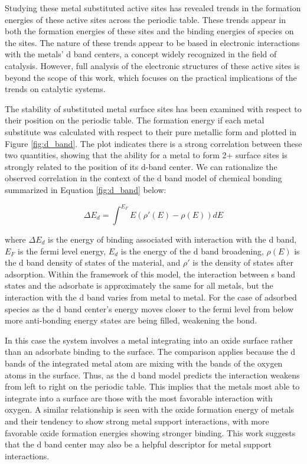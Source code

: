 \documentclass[catalysts,article,submit,moreauthors,pdftex,10pt,a4paper]{mdpi}
\theoremstyle{mdpi}
\newcounter{ex}
\newcounter{re}
\theoremstyle{mdpidefinition}
\begin{document}
Studying these metal substituted active sites has revealed trends in the formation energies of these active sites across the periodic table. These trends appear in both the formation energies of these sites and the binding energies of species on the sites. The nature of these trends appear to be based in electronic interactions with the metals' d band centers, a concept widely recognized in the field of catalysis\cite{Hammer_2000}. However, full analysis of the electronic structures of these active sites is beyond the scope of this work, which focuses on the practical implications of the trends on catalytic systems.

The stability of substituted metal surface sites has been examined with respect to their position on the periodic table. The formation energy if each metal substitute was calculated with respect to their pure metallic form and plotted in Figure \ref{fig:d_band}. The plot indicates there is a strong correlation between these two quantities, showing that the ability for a metal to form 2+ surface sites is strongly related to the position of its d-band center. We can rationalize the observed correlation in the context of the d band model of chemical bonding\cite{Nilsson_2008} summarized in Equation \ref{fig:d_band} below:

\begin{equation}
    \Delta E_d = \int^{E_F} E(\rho'(E) - \rho(E))dE
    \label{eq:d_band}
\end{equation}

where $\Delta E_d$ is the energy of binding associated with interaction with the d band, $E_F$ is the fermi level energy, $E_d$ is the energy of the d band broadening, $\rho(E)$ is the d band density of states of the material, and $\rho'$ is the density of states after adsorption. Within the framework of this model, the interaction between s band states and the adsorbate is approximately the same for all metals, but the interaction with the d band varies from metal to metal. For the case of adsorbed species as the d band center's energy moves closer to the fermi level from below more anti-bonding energy states are being filled, weakening the bond.

In this case the system involves a metal integrating into an oxide surface rather than an adsorbate binding to the surface. The comparison applies because the d bands of the integrated metal atom are mixing with the bands of the oxygen atoms in the surface. Thus, as the d band model predicts the interaction weakens from left to right on the periodic table. This implies that the metals most able to integrate into a surface are those with the most favorable interaction with oxygen. A similar relationship is seen with the oxide formation energy of metals and their tendency to show strong metal support interactions\cite{O_Connor_2018}, with more favorable oxide formation energies showing stronger binding. This work suggests that the d band center may also be a helpful descriptor for metal support interactions.
\end{document}
